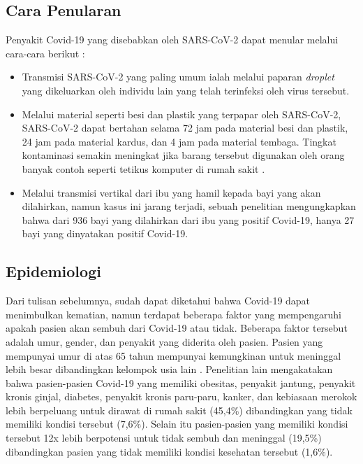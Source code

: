 \subsection{Cara Penularan}
Penyakit Covid-19 yang disebabkan oleh SARS-CoV-2 dapat menular melalui cara-cara berikut :

\begin{itemize}
    \item Transmisi SARS-CoV-2 yang paling umum ialah melalui paparan \textit{droplet} yang dikeluarkan oleh
    individu lain yang telah terinfeksi oleh virus tersebut.

    \item Melalui material seperti besi dan plastik yang terpapar oleh SARS-CoV-2, SARS-CoV-2 dapat bertahan 
    selama 72 jam pada material besi dan plastik, 24 jam pada material kardus, dan 4 jam pada material tembaga.
    Tingkat kontaminasi semakin meningkat jika barang tersebut digunakan oleh orang banyak contoh seperti tetikus
    komputer di rumah sakit \cite{pmid32275497}.

    \item Melalui transmisi vertikal dari ibu yang hamil kepada bayi yang akan dilahirkan, namun kasus ini jarang 
    terjadi, sebuah penelitian \cite{pmid32739398} mengungkapkan bahwa dari 936 bayi yang dilahirkan dari ibu yang positif Covid-19,
    hanya 27 bayi yang dinyatakan positif Covid-19.

\end{itemize}

\subsection{Epidemiologi}
Dari tulisan sebelumnya, sudah dapat diketahui bahwa Covid-19 dapat menimbulkan kematian, namun terdapat 
beberapa faktor yang mempengaruhi apakah pasien akan sembuh dari Covid-19 atau tidak. Beberapa faktor tersebut
adalah umur, gender, dan penyakit yang diderita oleh pasien. Pasien yang mempunyai umur di atas 65 tahun mempunyai
kemungkinan untuk meninggal lebih besar dibandingkan kelompok usia lain \cite{pmid33356661}. Penelitian lain
\cite{pmid32555134} mengakatakan bahwa pasien-pasien Covid-19 yang memiliki obesitas, penyakit jantung, penyakit
kronis ginjal, diabetes, penyakit kronis paru-paru, kanker, dan kebiasaan merokok lebih berpeluang untuk dirawat
di rumah sakit (45,4\%) dibandingkan yang tidak memiliki kondisi tersebut (7,6\%). Selain itu pasien-pasien
yang memiliki kondisi tersebut 12x lebih berpotensi untuk tidak sembuh dan meninggal (19,5\%) dibandingkan pasien
yang tidak memiliki kondisi kesehatan tersebut (1,6\%).

